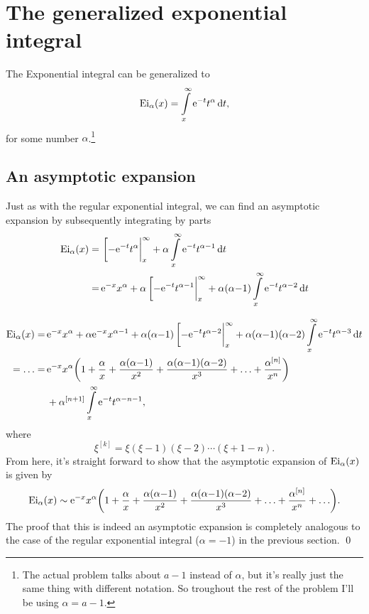 \documentclass[11pt,letter, swedish, english
]{article}
\newcommand{\Ei}{\ensuremath\mathrm{Ei}}
\begin{document}
\section{The generalized exponential integral}
\renewcommand{\thesubsubsection}{\arabic{section} (\alph{subsection},\,\roman{subsubsection})}
The Exponential integral can be generalized to
\begin{equation}
\Ei_\alpha(x)=\int_x^\infty\ee^{-t}t^{\alpha}\id{t},
\end{equation}
for some number $\alpha$.\footnote{The actual problem talks about
  $a-1$ instead of $\alpha$, but it's really just the same thing with
  different notation. So troughout the rest of the problem I'll be
  using $\alpha=a-1$.}

\subsection{An asymptotic expansion}
Just as with the regular exponential integral, we can find an
asymptotic expansion by subsequently integrating by parts
\begin{equation}
\begin{aligned}
\Ei_\alpha(x)%
=\,& \eval[-\ee^{-t}t^\alpha|_x^\infty +
\alpha\int_x^\infty\ee^{-t}t^{\alpha-1}\id{t} \\
=\,& \ee^{-x}x^\alpha +
\alpha\eval[-\ee^{-t}t^{\alpha-1}|_x^\infty +
\alpha(\alpha{-}1)\int_x^\infty\ee^{-t}t^{\alpha-2}\id{t} \\
\end{aligned}
\end{equation}\addtocounter{equation}{-1}
\begin{equation}
\begin{aligned}
\Ei_\alpha(x)=\,& \ee^{-x}x^\alpha + \alpha\ee^{-x}x^{\alpha-1}+ 
\alpha(\alpha{-}1)\eval[-\ee^{-t}t^{\alpha-2}|_x^\infty +
\alpha(\alpha{-}1)(\alpha{-}2)\int_x^\infty\ee^{-t}t^{\alpha-3}\id{t} \\
=\ldots=\,&\ee^{-x}x^\alpha \qty(
1+\frac{\alpha}{x} + \frac{\alpha(\alpha{-}1)}{x^2} 
+ \frac{\alpha(\alpha{-}1)(\alpha{-}2)}{x^3} +\ldots
+ \frac{\alpha^{[n]}}{x^n} )\\
&+\alpha^{[n+1]} \int_x^\infty \ee^{-t}t^{\alpha-n-1},
\end{aligned}
\end{equation}
where
\begin{equation}
\xi^{[k]} = \xi(\xi-1)(\xi-2)\cdots(\xi+1-n).
\end{equation}
From here, it's straight forward to show that the asymptotic expansion
of $\Ei_\alpha(x)$ is given by
\begin{equation}\label{eq:Ei_a}
\Ei_\alpha(x) \sim
\ee^{-x}x^\alpha \qty(
1+\frac{\alpha}{x} + \frac{\alpha(\alpha{-}1)}{x^2} 
+ \frac{\alpha(\alpha{-}1)(\alpha{-}2)}{x^3} +\ldots
+ \frac{\alpha^{[n]}}{x^n} + \ldots ).
\end{equation}
The proof that this is indeed an asymptotic expansion is completely
analogous to the case of the regular exponential integral
($\alpha=-1$) in the previous section.
\qed
\end{document}
